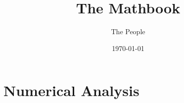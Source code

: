 \documentclass{book}
\title{The Mathbook}
\author{The People}
\date{\today}
\theoremstyle{remark}
\theoremstyle{definition}
\begin{document}
\maketitle




\chapter{Numerical Analysis}













\printindex
\end{document}
